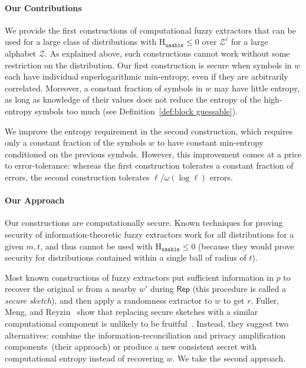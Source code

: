 \documentclass[11pt]{article}
\newcommand{\defref}[1]{\mbox{Definition~\ref{#1}}}
\newcommand{\class}[1]{{\ensuremath{\mathsf{#1}}}}
\newcommand{\rep}{\ensuremath{\class{Rep}}\xspace}
\newcommand{\Huse}{\mathrm{H}_{\mathtt{usable}}}
\begin{document}
\paragraph{Our Contributions}
We provide the first constructions of computational fuzzy extractors that can be used for a large class of distributions with $\Huse\le 0$ over $\mathcal{Z}^\ell$ for a large alphabet $\mathcal{Z}$.  As explained above, such constructions cannot work without some restriction on the distribution.
Our first construction is secure when symbols in $w$
each have individual superlogarithmic min-entropy, even if they are arbitrarily correlated. Moreover,
a constant fraction of symbols in $w$ may have little entropy, as long as knowledge of their values does not reduce the entropy of the high-entropy symbols too much (see \defref{def:block guessable}).

We improve the entropy requirement in the second construction, which requires only a constant fraction of the symbols $w$ to have constant min-entropy conditioned on the previous symbols.
However, this improvement comes at a price to error-tolerance: whereas the first construction tolerates a constant fraction of errors, the second construction tolerates $\ell/\omega(\log\ell)$ errors.



\paragraph{Our Approach}
Our constructions are computationally secure.  Known techniques for proving security of information-theoretic  fuzzy extractors work for all distributions for a given $m, t$, and thus cannot be used with $\Huse\le 0$ (because they would prove security for distributions contained within a single ball of radius of $t$). 

Most known constructions of fuzzy extractors put sufficient information in $p$ to recover the original $w$ from a nearby $w'$ during $\rep$ (this procedure is called a \emph{secure sketch}), and then apply a randomness extractor to $w$ to get $r$.
Fuller, Meng, and Reyzin~\cite{fuller2013computational} show that replacing secure sketches with a similar computational component is unlikely to be fruitful~\cite[Corollary 3.8, Theorem 3.10]{fuller2013computational}.  Instead, they suggest two alternatives: combine the information-reconciliation and privacy amplification components~(their approach) or produce a new consistent secret with computational entropy instead of recovering $w$.  We take the second approach.
\end{document}

